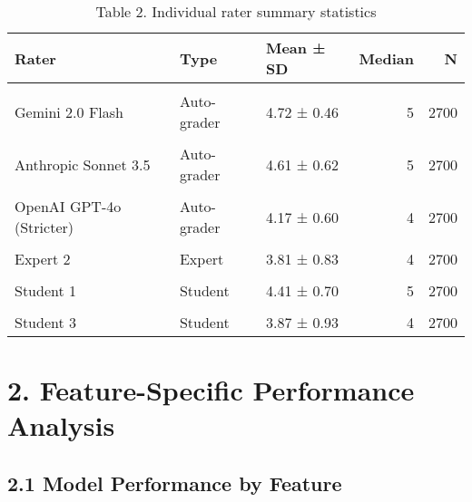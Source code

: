 \documentclass[
  11pt]{report}
\begin{document}
\begin{longtable}[t]{lllrr}
\caption{Table 2. Individual rater summary statistics}\\
\toprule
Rater & Type & Mean ± SD & Median & N\\
\midrule
\cellcolor{gray!10}{OpenAI GPT-4o} & \cellcolor{gray!10}{Auto-grader} & \cellcolor{gray!10}{4.79 ± 0.46} & \cellcolor{gray!10}{5} & \cellcolor{gray!10}{2700}\\
Gemini 2.0 Flash & Auto-grader & 4.72 ± 0.46 & 5 & 2700\\
\cellcolor{gray!10}{Gemini 2.5 Pro} & \cellcolor{gray!10}{Auto-grader} & \cellcolor{gray!10}{4.65 ± 0.57} & \cellcolor{gray!10}{5} & \cellcolor{gray!10}{2700}\\
Anthropic Sonnet 3.5 & Auto-grader & 4.61 ± 0.62 & 5 & 2700\\
\cellcolor{gray!10}{Anthropic Sonnet 4} & \cellcolor{gray!10}{Auto-grader} & \cellcolor{gray!10}{4.51 ± 0.65} & \cellcolor{gray!10}{5} & \cellcolor{gray!10}{2700}\\
\addlinespace
OpenAI GPT-4o (Stricter) & Auto-grader & 4.17 ± 0.60 & 4 & 2700\\
\cellcolor{gray!10}{Expert 1} & \cellcolor{gray!10}{Expert} & \cellcolor{gray!10}{4.17 ± 0.79} & \cellcolor{gray!10}{4} & \cellcolor{gray!10}{2700}\\
Expert 2 & Expert & 3.81 ± 0.83 & 4 & 2700\\
\cellcolor{gray!10}{Expert 3} & \cellcolor{gray!10}{Expert} & \cellcolor{gray!10}{3.39 ± 1.00} & \cellcolor{gray!10}{3} & \cellcolor{gray!10}{2700}\\
Student 1 & Student & 4.41 ± 0.70 & 5 & 2700\\
\addlinespace
\cellcolor{gray!10}{Student 2} & \cellcolor{gray!10}{Student} & \cellcolor{gray!10}{4.02 ± 0.89} & \cellcolor{gray!10}{4} & \cellcolor{gray!10}{2700}\\
Student 3 & Student & 3.87 ± 0.93 & 4 & 2700\\
\bottomrule
\end{longtable}

\section{2. Feature-Specific Performance
Analysis}\label{feature-specific-performance-analysis}

\subsection{2.1 Model Performance by
Feature}\label{model-performance-by-feature}
\end{document}
